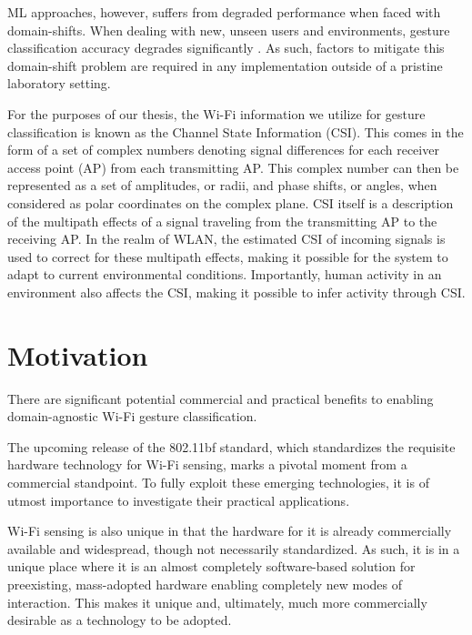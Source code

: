 ML approaches, however, suffers from degraded performance when faced with domain-shifts.
When dealing with new, unseen users and environments, gesture classification accuracy degrades significantly \cite{chetty2011through,adib2013see,pu2013whole,adib20143d,he2015wig,jiang2018towards,zheng2019zero,jiang2020wigan,ma2021location}.
As such, factors to mitigate this domain-shift problem are required in any implementation outside of a pristine laboratory setting.

For the purposes of our thesis, the Wi-Fi information we utilize for gesture classification is known as the Channel State Information (CSI).
This comes in the form of a set of complex numbers denoting signal differences for each receiver access point (AP) from each transmitting AP.
This complex number can then be represented as a set of amplitudes, or radii, and phase shifts, or angles, when considered as polar coordinates on the complex plane.
CSI itself is a description of the multipath effects of a signal traveling from the transmitting AP to the receiving AP.
In the realm of WLAN, the estimated CSI of incoming signals is used to correct for these multipath effects, making it possible for the system to adapt to current environmental conditions.
Importantly, human activity in an environment also affects the CSI, making it possible to infer activity through CSI.

\section{Motivation}\label{sec:intro-motivation}

There are significant potential commercial and practical benefits to enabling domain-agnostic Wi-Fi gesture classification.

The upcoming release of the 802.11bf standard, which standardizes the requisite hardware technology for Wi-Fi sensing, marks a pivotal moment from a commercial standpoint. To fully exploit these emerging technologies, it is of utmost importance to investigate their practical applications.

Wi-Fi sensing is also unique in that the hardware for it is already commercially available and widespread, though not necessarily standardized.
As such, it is in a unique place where it is an almost completely software-based solution for preexisting, mass-adopted hardware enabling completely new modes of interaction.
This makes it unique and, ultimately, much more commercially desirable as a technology to be adopted.

